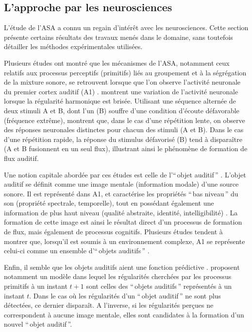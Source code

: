 \subsection{L'approche par les neurosciences}
\label{sec:ch3_asaNeuro}

L'étude de l'ASA a connu un regain d'intérêt avec les neurosciences. Cette section présente certains résultats des travaux menés dans le domaine, sans toutefois détailler les méthodes expérimentales utilisées.

Plusieurs études ont montré que les mécanismes de l'ASA, notamment ceux relatifs aux processus perceptifs (primitifs) liés au groupement et à la ségrégation de la mixture sonore, se retrouvent lorsque que l'on observe l'activité neuronale du premier cortex auditif (A1) \citep{nelken2004processing,carlyon2004brain,snyder2007toward}. \citep{dyson2004representation} montrent une variation de l'activité neuronale lorsque la régularité harmonique est brisée. Utilisant une séquence alternée de deux stimuli A et B, dont l'un (B) souffre d'une condition d'écoute défavorable (fréquence extrême), \citep{fishman2001neural} montrent que, dans le cas d'une répétition lente, on observe des réponses neuronales distinctes pour chacun des stimuli (A et B). Dans le cas d'une répétition rapide, la réponse du stimulus défavorisé (B) tend à disparaître (A et B fusionnent en un seul flux), illustrant ainsi le phénomène de formation de flux auditif.
   
Une notion capitale abordée par ces études est celle de l'``\,objet auditif\,'' \citep{nelken2004processing}. L'objet auditif se définit comme une image mentale (information modale) d'une source sonore. Il est représenté dans A1, et caractérise les propriétés ``\,bas niveau\,'' du son (propriété spectrale, temporelle), tout en possédant également une information de plus haut niveau (qualité abstraite, identité, intelligibilité) \citep{nelken2008neurons}. La formation de cette image est ainsi le résultat direct d'un processus de formation de flux, mais également de processus cognitifs. Plusieurs études tendent à montrer que, lorsqu'il est soumis à un environnement complexe, A1 se représente celui-ci comme un ensemble d'``\,objets auditifs\,'' \citep{kocsis2016promoting}.

Enfin, il semble que les objets auditifs aient une fonction prédictive \citep{winkler2015auditory}. \citep{winkler2009modeling} proposent notamment un modèle dans lequel les régularités cherchées par les processus primitifs à un instant $t+1$ sont celles des ``\,objets auditifs\,'' représentés à un instant $t$. Dans le cas où les régularités d'un ``\,objet auditif\,'' ne sont plus détectées, ce dernier disparaît. A l'inverse, si les régularités perçues ne correspondent à aucune image mentale, elles sont candidates à la formation d'un nouvel ``\,objet auditif\,''.

